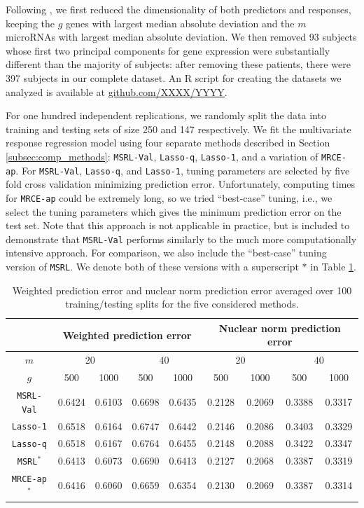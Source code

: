 \documentclass[12pt]{article}
\begin{document}
Following \citet{wang2015joint}, we first reduced the dimensionality of both predictors and responses, keeping the $g$ genes with largest median absolute deviation and the $m$ microRNAs with largest median absolute deviation.  We then removed 93 subjects whose first two principal components for gene expression were substantially different than the majority of subjects: after removing these patients, there were 397 subjects in our complete dataset. An R script for creating the datasets we analyzed is available at \href{http://github.com/XXXX/YYYY}{github.com/XXXX/YYYY}. 

For one hundred independent replications, we randomly split the data into training and testing sets of size 250 and 147 respectively. We fit the multivariate response regression model using four separate methods described in Section \ref{subsec:comp_methods}: \texttt{MSRL-Val}, \texttt{Lasso-q}, \texttt{Lasso-1}, and a variation of \texttt{MRCE-ap}. For \texttt{MSRL-Val}, \texttt{Lasso-q}, and \texttt{Lasso-1}, tuning parameters are selected by five fold cross validation minimizing prediction error. Unfortunately, computing times for \texttt{MRCE-ap} could be extremely long, so we tried ``best-case'' tuning, i.e., we select the tuning parameters which gives the minimum prediction error on the test set. Note that this approach is not applicable in practice, but is included to demonstrate that \texttt{MSRL-Val} performs similarly to the much more computationally intensive approach. For comparison, we also include the ``best-case'' tuning version of \texttt{MSRL}.  We denote both of these versions with a superscript $*$ in Table \ref{table:TCGA}.

\begin{table}[t!]
\centering
\begin{tabular}{|c|cc|cc|cc|cc|}
  \hline
  & \multicolumn{4}{c|}{Weighted prediction error} & \multicolumn{4}{|c|}{Nuclear norm prediction error} \\
  \hline
$m$ & \multicolumn{2}{c|}{20} & \multicolumn{2}{c|}{40} & \multicolumn{2}{c|}{20} & \multicolumn{2}{c|}{40} \\
$g$ &  500 & 1000 & 500 & 1000 & 500 & 1000 & 500 & 1000 \\ 
  \hline
   \texttt{MSRL-Val} & 0.6424 & 0.6103 & 0.6698 & 0.6435 & 0.2128 & 0.2069 & 0.3388 & 0.3317 \\ 
 \texttt{Lasso-1}  & 0.6518 & 0.6164 & 0.6747 & 0.6442 & 0.2146 & 0.2086 & 0.3403 & 0.3329 \\ 
   \texttt{Lasso-q} & 0.6518 & 0.6167 & 0.6764 & 0.6455 & 0.2148 & 0.2088 & 0.3422 & 0.3347 \\ 
   \hline
   \hline
   \texttt{MSRL}$^*$ & 0.6413 & 0.6073 & 0.6690 & 0.6413 & 0.2127 & 0.2068 & 0.3387 & 0.3319 \\ 
  \texttt{MRCE-ap}$^*$ & 0.6416 & 0.6060 & 0.6659 & 0.6354 & 0.2130 & 0.2069 & 0.3387 & 0.3314 \\ 
  \hline
\end{tabular}
\caption{Weighted prediction error and nuclear norm prediction error averaged over 100 training/testing splits for the five considered methods. }\label{table:TCGA}
\end{table}
\end{document}
